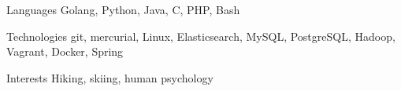 
\begin{cvskills}

  \cvskill
    {Languages} %
    {Golang, Python, Java, C, PHP, Bash} %

  \cvskill
    {Technologies} %
    {git, mercurial, Linux, Elasticsearch, MySQL, PostgreSQL, Hadoop, Vagrant, Docker, Spring} %

  \cvskill
    {Interests} %
    {Hiking, skiing, human psychology} %


\end{cvskills}
